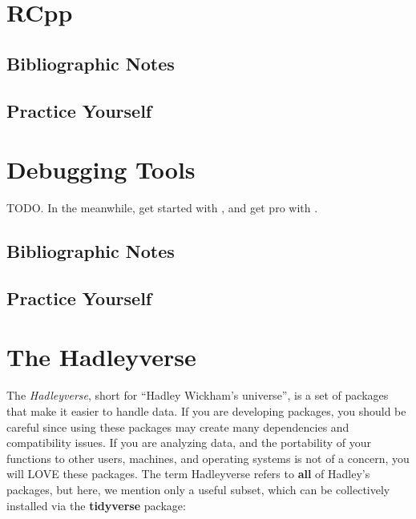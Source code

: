\documentclass[]{book}
\theoremstyle{definition}
\theoremstyle{definition}
\theoremstyle{definition}
\theoremstyle{remark}
\begin{document}
\hypertarget{rcpp}{%
\chapter{RCpp}\label{rcpp}}

\hypertarget{bibliographic-notes-17}{%
\section{Bibliographic Notes}\label{bibliographic-notes-17}}

\hypertarget{practice-yourself-15}{%
\section{Practice Yourself}\label{practice-yourself-15}}

\hypertarget{debugging}{%
\chapter{Debugging Tools}\label{debugging}}

TODO.
In the meanwhile, get started with \citet{wickham2011testthat}, and get pro with \citet{cotton2017testing}.

\hypertarget{bibliographic-notes-18}{%
\section{Bibliographic Notes}\label{bibliographic-notes-18}}

\hypertarget{practice-yourself-16}{%
\section{Practice Yourself}\label{practice-yourself-16}}

\hypertarget{hadley}{%
\chapter{The Hadleyverse}\label{hadley}}

The \emph{Hadleyverse}, short for ``Hadley Wickham's universe'', is a set of packages that make it easier to handle data.
If you are developing packages, you should be careful since using these packages may create many dependencies and compatibility issues.
If you are analyzing data, and the portability of your functions to other users, machines, and operating systems is not of a concern, you will LOVE these packages.
The term Hadleyverse refers to \textbf{all} of Hadley's packages, but here, we mention only a useful subset, which can be collectively installed via the \textbf{tidyverse} package:
\end{document}
